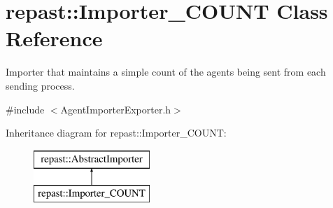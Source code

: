 \hypertarget{classrepast_1_1_importer___c_o_u_n_t}{\section{repast\-:\-:Importer\-\_\-\-C\-O\-U\-N\-T Class Reference}
\label{classrepast_1_1_importer___c_o_u_n_t}
}


Importer that maintains a simple count of the agents being sent from each sending process.  




{\ttfamily \#include $<$Agent\-Importer\-Exporter.\-h$>$}

Inheritance diagram for repast\-:\-:Importer\-\_\-\-C\-O\-U\-N\-T\-:\begin{figure}[H]
\begin{center}
\leavevmode
\includegraphics[height=2.000000cm]{classrepast_1_1_importer___c_o_u_n_t}
\end{center}
\end{figure}
